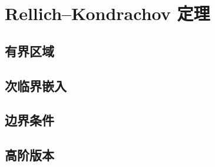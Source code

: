 \section{Rellich–Kondrachov 定理}
\label{b1:sec:2502}


\subsection{有界区域}
\label{b1:subsec:250201}

\subsection{次临界嵌入}
\label{b1:subsec:250202}

\subsection{边界条件}
\label{b1:subsec:250203}

\subsection{高阶版本}
\label{b1:subsec:250204}


